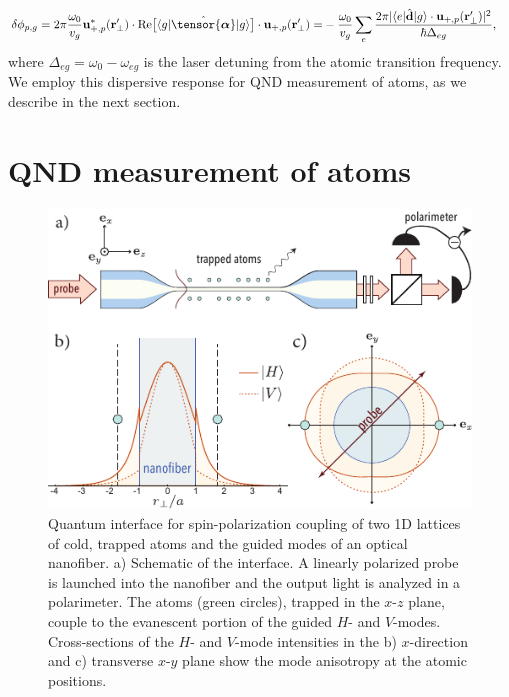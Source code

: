\documentclass[preprint, aps,pra,onecolumn]{revtex4-1} %
\begin{document}
	\begin{align} \label{Eq::PhaseShiftMultilevel}
		\delta  \phi_{p,g} =2\pi \frac{ \omega_{0} }{v_g} \mathbf{u}^*_{+, p}(\br'_\perp) \cdot {\rm Re}\big[\bra{g} \hat{\tensor{\boldsymbol{\alpha}}} \ket{g} \big] \cdot \mathbf{u}_{+, p}(\br'_\perp) =& -\frac{ \omega_{0} }{v_g} \sum_e \frac{2 \pi |\bra{e}\hat{\mathbf{d}}\ket{g} \cdot \mathbf{u}_{+,p}(\br'_\perp)|^2}{ \hbar  \Delta_{eg} } ,
	\end{align}
where $\Delta_{eg} = \omega_0 - \omega_{eg}$ is the laser detuning from the atomic transition frequency.  
We employ this dispersive response for QND measurement of atoms, as we describe in the next section.



\section{QND measurement of atoms} \label{Sec::QNDMeasurement}

\begin{figure}[t]
\includegraphics[scale=1]{./Figs/Fig_NanofiberSchematic}
\caption{Quantum interface for spin-polarization coupling of two 1D lattices of cold, trapped atoms and the guided modes of an optical nanofiber. a) Schematic of the interface.  A linearly polarized probe is launched into the nanofiber and the output light is analyzed in a polarimeter.  The atoms (green circles), trapped {\color{blue} in the $x$-$z$ plane}, couple to the evanescent portion of the guided $H$- and $V$-modes.  Cross-sections of the $H$- and $V$-mode intensities in the b) $x$-direction and c) transverse $x$-$y$ plane show the mode anisotropy at the atomic positions. }\label{Fig::Schematic}
\end{figure}
\end{document}
